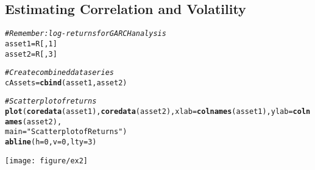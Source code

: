 \documentclass[a4paper]{article}\usepackage[]{graphicx}\usepackage[]{color}
\makeatletter
\def\maxwidth{ %
  \ifdim\Gin@nat@width>\linewidth
    \linewidth
  \else
    \Gin@nat@width
  \fi
}
\newcommand{\hlnum}[1]{\textcolor[rgb]{0.686,0.059,0.569}{#1}}%
\newcommand{\hlstr}[1]{\textcolor[rgb]{0.192,0.494,0.8}{#1}}%
\newcommand{\hlcom}[1]{\textcolor[rgb]{0.678,0.584,0.686}{\textit{#1}}}%
\newcommand{\hlstd}[1]{\textcolor[rgb]{0.345,0.345,0.345}{#1}}%
\newcommand{\hlkwb}[1]{\textcolor[rgb]{0.69,0.353,0.396}{#1}}%
\newcommand{\hlkwc}[1]{\textcolor[rgb]{0.333,0.667,0.333}{#1}}%
\newcommand{\hlkwd}[1]{\textcolor[rgb]{0.737,0.353,0.396}{\textbf{#1}}}%
\newenvironment{kframe}{%
 \def\at@end@of@kframe{}%
 \ifinner\ifhmode%
  \def\at@end@of@kframe{\end{minipage}}%
  \begin{minipage}{\columnwidth}%
 \fi\fi%
 \def\FrameCommand##1{\hskip\@totalleftmargin \hskip-\fboxsep
 \colorbox{shadecolor}{##1}\hskip-\fboxsep
     \hskip-\linewidth \hskip-\@totalleftmargin \hskip\columnwidth}%
 \MakeFramed {\advance\hsize-\width
   \@totalleftmargin\z@ \linewidth\hsize
   \@setminipage}}%
 {\par\unskip\endMakeFramed%
 \at@end@of@kframe}
\newenvironment{knitrout}{}{} %
\makeatother
\begin{document}
\subsection{Estimating Correlation and Volatility}
\begin{knitrout}
\color{fgcolor}\begin{kframe}
\begin{alltt}
\hlcom{# Remember: log-returns for GARCH analysis}
\hlstd{asset1} \hlkwb{=} \hlstd{R[,} \hlnum{1}\hlstd{]}
\hlstd{asset2} \hlkwb{=} \hlstd{R[,} \hlnum{3}\hlstd{]}

\hlcom{# Create combined data series}
\hlstd{cAssets} \hlkwb{=} \hlkwd{cbind}\hlstd{(asset1, asset2)}

\hlcom{# Scatterplot of returns}
\hlkwd{plot}\hlstd{(}\hlkwd{coredata}\hlstd{(asset1),} \hlkwd{coredata}\hlstd{(asset2),} \hlkwc{xlab} \hlstd{=} \hlkwd{colnames}\hlstd{(asset1),} \hlkwc{ylab} \hlstd{=} \hlkwd{colnames}\hlstd{(asset2),}
    \hlkwc{main} \hlstd{=} \hlstr{"Scatterplot of Returns"}\hlstd{)}
\hlkwd{abline}\hlstd{(}\hlkwc{h} \hlstd{=} \hlnum{0}\hlstd{,} \hlkwc{v} \hlstd{=} \hlnum{0}\hlstd{,} \hlkwc{lty} \hlstd{=} \hlnum{3}\hlstd{)}
\end{alltt}
\end{kframe}
\texttt{[image: figure/ex2]} 

\end{knitrout}
\end{document}
